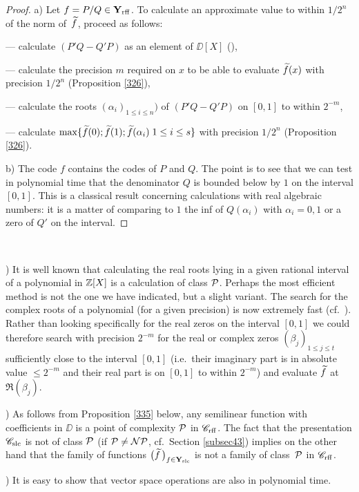 \begin{proof} 
a) Let $f = P/Q \in {{\bf Y}_{\rm rff}} $. To calculate an approximate value to within $1/2^n$ of the norm of~$\widetilde{f}$, proceed as follows:


\noindent 
--- calculate $(P'Q - Q'P)$ as an element of $\DD[X]$ (),

\noindent 
--- calculate  the precision $m$ 
 required on $x$ to be able to evaluate $\widetilde{f} (x)$ with precision $1/2^n$ (Proposition \ref{326}),

\noindent 
--- calculate the roots $(\alpha_i)_{1 \leq i \leq n})$ of $(P'Q - Q'P)$ on $[0,1]$ to within $2^{-m}$, 

\noindent 
--- calculate $\max \{\widetilde{f}(0);\widetilde{f}(1);\widetilde{f}(\alpha_i)
 \; 1 \leq i \leq s \}$ with precision $1/2^n$ (Proposition \ref{326}).

\noindent 
b) The code $f$ contains the codes of $P$ and $Q$. The point is to see that we can test in polynomial time that the denominator $Q$ is bounded below by $1$ on the interval $[0,1]$. 
This is a classical result concerning calculations with real algebraic numbers: it is a matter of comparing to $1$ the inf of $Q(\alpha_i)$ with $\alpha_i=0,1$ or a zero of $Q'$ on the interval. 
\end{proof}

\begin{remarks}\label{328}~

) It is well known that calculating the real roots lying in a given rational interval of a polynomial in  $\mathbb {Z}[X]$ is a calculation of class ${\cal P}$. 
Perhaps the most efficient method is not the one we have indicated, but a slight variant. The search for the complex roots of a polynomial (for a given precision) is now extremely fast (cf.\ \cite {Pa}). 
Rather than looking specifically for the real zeros on the interval $[0,1]$ we could therefore search with precision $2^{-m}$ for the real or complex zeros $(\beta_j)_{1 \leq j \leq t}$ sufficiently close to the interval $[0,1]$ (i.e.\ their imaginary part is in absolute value $\leq 2^{-m}$ and their real part is on $[0,1]$ to within $2^{-m}$) and evaluate $\widetilde{f}$ at $\Re(\beta_j)$.

) As follows from Proposition \ref{335} below, any semilinear function with coefficients in $\DD$ is a point of complexity ${\cal P}$ in ${{{\mathscr C}}_{\rm rff}}$. 
The fact that the presentation ${{{\mathscr C}}_{\rm slc}}$ is not of class ${\cal P}$ (if ${\cal P} \neq {\cal NP}$, cf.\ Section \ref{subsec43}) implies on the other hand that the family of functions $\big(\widetilde{f}\,\big)_{f \in {{\bf Y}_{\rm slc}} }$ is not a family of class~${\cal P}$ in ${{{\mathscr C}}_{\rm rff}}$.

) It is easy to show that vector space operations are also in polynomial time. 
\end{remarks}

